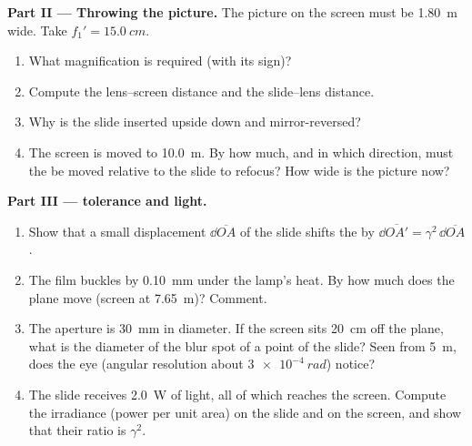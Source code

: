 \begin{problem}
\medskip
\noindent\textbf{Part II --- Throwing the picture.}
The picture on the screen must be \qty{1.80}{m} wide. Take
$f_1' = \qty{15.0}{cm}$.
\begin{enumerate}[resume]
  \item What magnification is required (with its sign)?
  \item Compute the lens--screen distance and the slide--lens distance.
  \item Why is the slide inserted upside down and mirror-reversed?
  \item The screen is moved to \qty{10.0}{m}. By how much, and in which
        direction, must the  be moved relative to the slide to
        refocus? How wide is the picture now?
\end{enumerate}

\medskip
\noindent\textbf{Part III ---  tolerance and light.}
\begin{enumerate}[resume]
  \item Show that a small displacement $\dd\overline{OA}$ of the slide
        shifts the  by $\dd\overline{OA'} = \gamma^2\,\dd\overline{OA}$.
  \item The film buckles by \qty{0.10}{mm} under the lamp's heat. By how
        much does the  plane move (screen at \qty{7.65}{m})?
        Comment.
  \item The  aperture is \qty{30}{mm} in diameter. If the screen
        sits \qty{20}{cm} off the  plane, what is the diameter of
        the blur spot of a point of the slide? Seen from \qty{5}{m},
        does the eye (angular resolution about $\qty{3e-4}{rad}$) notice?
  \item The slide receives \qty{2.0}{W} of light, all of which reaches
        the screen. Compute the irradiance (power per unit area) on the
        slide and on the screen, and show that their ratio is $\gamma^2$.
\end{enumerate}


\end{problem}
